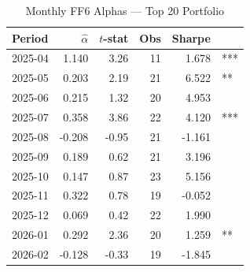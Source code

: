 \begin{table}[htbp]\centering
\caption{Monthly FF6 Alphas — Top 20 Portfolio}
\label{tab:alpha_monthly}
\begin{tabular}{lrrrrl}
\toprule
Period & $\hat{\alpha}$ & $t$-stat & Obs & Sharpe & \\
\midrule
2025-04 & 1.140 & 3.26 & 11 & 1.678 & *** \\
2025-05 & 0.203 & 2.19 & 21 & 6.522 & ** \\
2025-06 & 0.215 & 1.32 & 20 & 4.953 &  \\
2025-07 & 0.358 & 3.86 & 22 & 4.120 & *** \\
2025-08 & -0.208 & -0.95 & 21 & -1.161 &  \\
2025-09 & 0.189 & 0.62 & 21 & 3.196 &  \\
2025-10 & 0.147 & 0.87 & 23 & 5.156 &  \\
2025-11 & 0.322 & 0.78 & 19 & -0.052 &  \\
2025-12 & 0.069 & 0.42 & 22 & 1.990 &  \\
2026-01 & 0.292 & 2.36 & 20 & 1.259 & ** \\
2026-02 & -0.128 & -0.33 & 19 & -1.845 &  \\
\bottomrule
\end{tabular}
\end{table}